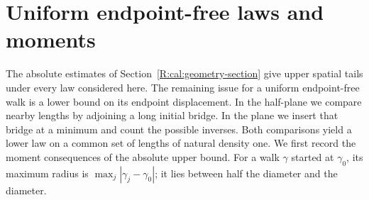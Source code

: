 \section{Uniform endpoint-free laws and moments}\label{R:cal:uniform-section}
The absolute estimates of Section~\ref{R:cal:geometry-section} give upper
spatial tails under every law considered here. The remaining issue for a
uniform endpoint-free walk is a lower bound on its endpoint displacement.
In the half-plane we compare nearby lengths by adjoining a long initial
bridge. In the plane we insert that bridge at a minimum and count the
possible inverses. Both comparisons yield a lower law on a common set of
lengths of natural density one. We first record the moment consequences
of the absolute upper bound. For a walk $\gamma$ started at $\gamma_0$,
its maximum radius is $\max_j|\gamma_j-\gamma_0|$; it lies between
half the diameter and the diameter.

